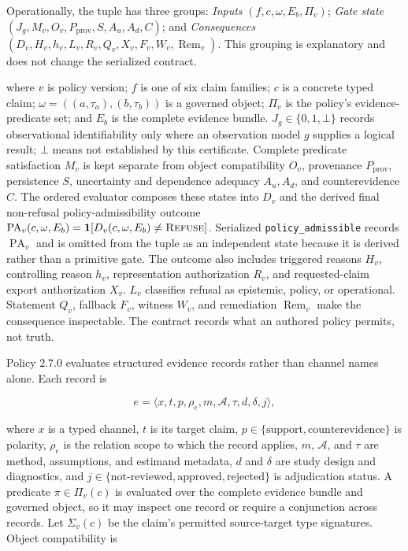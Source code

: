 \documentclass[manuscript,screen,review]{acmart}
\begin{document}
Operationally, the tuple has three groups: \emph{Inputs} $(f,c,\omega,E_b,\Pi_v)$; \emph{Gate state} $(J_g,M_v,O_v,P_{\mathrm{prov}},S,A_u,A_d,C)$; and \emph{Consequences} $(D_v,H_v,h_v,L_v,R_v,Q_v,X_v,F_v,W_v,\operatorname{Rem}_v)$. This grouping is explanatory and does not change the serialized contract.

where $v$ is policy version; $f$ is one of six claim families; $c$ is a concrete typed claim; $\omega=((a,\tau_a),(b,\tau_b))$ is a governed object; $\Pi_v$ is the policy's evidence-predicate set; and $E_b$ is the complete evidence bundle. $J_g\in\{0,1,\bot\}$ records observational identifiability only where an observation model $g$ supplies a logical result; $\bot$ means not established by this certificate. Complete predicate satisfaction $M_v$ is kept separate from object compatibility $O_v$, provenance $P_{\mathrm{prov}}$, persistence $S$, uncertainty and dependence adequacy $A_u,A_d$, and counterevidence $C$. The ordered evaluator composes these states into $D_v$ and the derived final non-refusal policy-admissibility outcome $\operatorname{PA}_v(c,\omega,E_b)=\mathbf{1}[D_v(c,\omega,E_b)\neq\textsc{Refuse}]$. Serialized \texttt{policy\_admissible} records $\operatorname{PA}_v$ and is omitted from the tuple as an independent state because it is derived rather than a primitive gate. The outcome also includes triggered reasons $H_v$, controlling reason $h_v$, representation authorization $R_v$, and requested-claim export authorization $X_v$. $L_v$ classifies refusal as epistemic, policy, or operational. Statement $Q_v$, fallback $F_v$, witness $W_v$, and remediation $\operatorname{Rem}_v$ make the consequence inspectable. The contract records what an authored policy permits, not truth.

Policy 2.7.0 evaluates structured evidence records rather than channel names alone. Each record is

\begin{equation}
e=\langle x,t,p,\rho_e,m,\mathcal{A},\tau,d,\delta,j\rangle,
\end{equation}

where $x$ is a typed channel, $t$ is its target claim, $p\in\{\mathrm{support},\mathrm{counterevidence}\}$ is polarity, $\rho_e$ is the relation scope to which the record applies, $m$, $\mathcal{A}$, and $\tau$ are method, assumptions, and estimand metadata, $d$ and $\delta$ are study design and diagnostics, and $j\in\{\mathrm{not\mbox{-}reviewed},\mathrm{approved},\mathrm{rejected}\}$ is adjudication status. A predicate $\pi\in\Pi_v(c)$ is evaluated over the complete evidence bundle and governed object, so it may inspect one record or require a conjunction across records. Let $\Sigma_v(c)$ be the claim's permitted source-target type signatures. Object compatibility is
\end{document}
